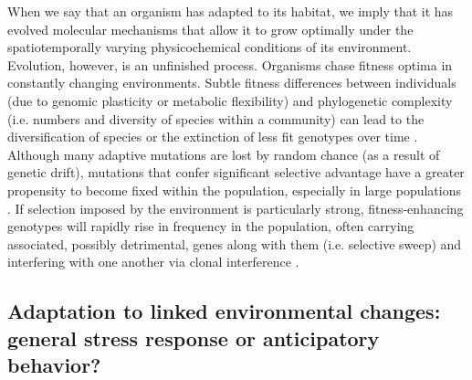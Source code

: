 When we say that an organism has adapted to its habitat, we imply that it has evolved molecular mechanisms that allow it to grow optimally under the spatiotemporally varying physicochemical conditions of its environment. Evolution, however, is an unfinished process. Organisms chase fitness optima in constantly changing environments. Subtle fitness differences between individuals (due to genomic plasticity or metabolic flexibility) and phylogenetic complexity (i.e. numbers and diversity of species within a community) can lead to the diversification of species or the extinction of less fit genotypes over time \cite{kassen_toward_2009}. Although many adaptive mutations are lost by random chance (as a result of genetic drift), mutations that confer significant selective advantage have a greater propensity to become fixed within the population, especially in large populations \cite{orr_theories_2005}.  If selection imposed by the environment is particularly strong, fitness-enhancing genotypes will rapidly rise in frequency in the population, often carrying associated, possibly detrimental, genes along with them  (i.e. selective sweep) \cite{papadopoulos_genomic_1999} and interfering with one another via clonal interference \cite{de_visser_clonal_2006}. 

\subsection{Adaptation to linked environmental changes: general stress response or anticipatory behavior?}   

